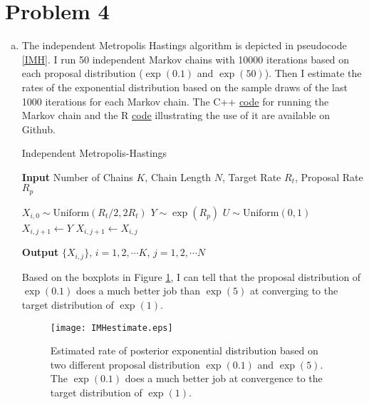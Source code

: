 \documentclass[12pt]{article}
\begin{document}
\section*{Problem 4}

\begin{enumerate}[(a)]
	\item The independent Metropolis Hastings algorithm is depicted in pseudocode \ref{IMH}. I run 50 independent Markov chains with 10000 iterations based on each proposal distribution ($\exp(0.1)$ and $\exp(50)$). Then I estimate the rates of the exponential distribution based on the sample draws of the last 1000 iterations for each Markov chain. The C++ \href{https://github.com/mkbwang/BIOSTAT882/blob/master/HW1/P4.cpp}{code} for running the Markov chain and the R \href{https://github.com/mkbwang/BIOSTAT882/blob/master/HW1/P4.R}{code} illustrating the use of it are available on Github. 
	
	\begin{algorithm}
		\caption{Independent Metropolis-Hastings}\label{IMH}
		\hspace*{\algorithmicindent} \textbf{Input} Number of Chains $K$, Chain Length $N$, Target Rate $R_{t}$, Proposal Rate $R_{p}$
		\begin{algorithmic}[1]
			\State $X_{i,0} \sim \text{Uniform}(R_t/2, 2R_t)$
			\State $Y \sim \exp (R_p)$
			\State $U \sim \text{Uniform}(0, 1)$
			\State $X_{i,j+1}\gets Y$
			\Else
			\State $X_{i,j+1}\gets X_{i,j}$
			\EndIf
			\EndFor
			\EndFor
		\end{algorithmic}
		\hspace*{\algorithmicindent} \textbf{Output} $\{ X_{i,j}\}$, $i=1,2,\cdots K$, $j=1,2,\cdots N$
	\end{algorithm}
	
	
	Based on the boxplots in Figure \ref{IMHperformance}, I can tell that the proposal distribution of $\exp(0.1)$ does a much better job than $\exp(5)$ at converging to the target distribution of $\exp(1)$.
	
	\begin{figure}[htbp]
		\centering
		\texttt{[image: IMHestimate.eps]}
		\caption{Estimated rate of posterior exponential distribution based on two different proposal distribution $\exp(0.1)$ and $\exp(5)$. The $\exp(0.1)$ does a much better job at convergence to the target distribution of $\exp(1)$.}\label{IMHperformance}
	\end{figure}


\end{enumerate}
\end{document}

